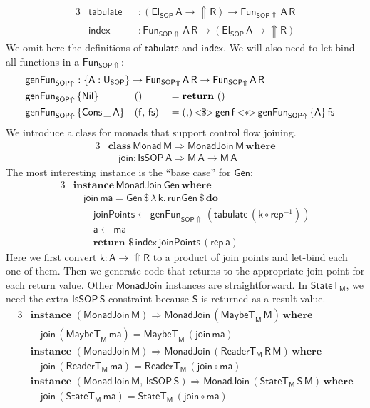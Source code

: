 \documentclass[acmsmall,screen,review,anonymous]{acmart}
\newcommand{\mit}[1]{{\mathsf{#1}}}
\newcommand{\msf}[1]{{\mathsf{#1}}}
\newcommand{\mbf}[1]{{\mathbf{#1}}}
\newcommand{\mdo}{\mbf{do}\,}
\newcommand{\ind}{\hspace{1em}}
\newcommand{\return}{\mbf{return}\,}
\newcommand{\lam}{\lambda\,}
\newcommand{\where}{\mbf{where}}
\newcommand{\M}{\msf{M}}
\newcommand{\vma}{\mathsf{ma}}
\newcommand{\vk}{\mathsf{k}}
\newcommand{\vA}{\mathsf{A}}
\newcommand{\vS}{\mathsf{S}}
\newcommand{\vR}{\mathsf{R}}
\newcommand{\vM}{\mathsf{M}}
\newcommand{\va}{\mathsf{a}}
\newcommand{\vf}{\mathsf{f}}
\newcommand{\vfs}{\mathsf{fs}}
\newcommand{\SOP}{\msf{SOP}}
\newcommand{\El}{\msf{El}}
\newcommand{\USOP}{\msf{U}_{\msf{SOP}}}
\newcommand{\IsSOP}{\msf{IsSOP}}
\newcommand{\Nil}{\msf{Nil}}
\newcommand{\Cons}{\msf{Cons}}
\newcommand{\ReaderT}{\msf{ReaderT}}
\newcommand{\Monad}{\msf{Monad}}
\newcommand{\fro}{\leftarrow}
\newcommand{\Lift}{{\Uparrow}}
\newcommand{\MaybeT}{\msf{MaybeT}}
\theoremstyle{remark}
\newcommand{\tyclass}{\mbf{class}}
\newcommand{\instance}{\mbf{instance}\,}
\newcommand{\Gen}{\msf{Gen}}
\newcommand{\gen}{\mit{gen}}
\newcommand{\fmap}{<\!\!\$\!\!>}
\newcommand{\ap}{{<\!\!*\!\!>}}
\newcommand{\runGen}{\mit{runGen}}
\newcommand{\RA}{\Rightarrow}
\newcommand{\StateT}{\msf{StateT}}
\newcommand{\dlr}{\,\$\,}
\newcommand{\MonadJoin}{\msf{MonadJoin}}
\newcommand{\join}{\mit{join}}
\newcommand{\mindex}{\mit{index}}
\newcommand{\mtabulate}{\mit{tabulate}}
\begin{document}
\begin{alignat*}{3}
  &\mtabulate &&: (\El_\SOP\,\vA \to \Lift \vR) \to \mit{Fun}_{\SOP\Lift}\,\vA\,\vR\\
  &\mindex    &&: \mit{Fun}_{\SOP\Lift}\,\vA\,\vR \to (\El_\SOP\,\vA \to \Lift \vR)
\end{alignat*}
We omit here the definitions of $\mtabulate$ and $\mindex$. We will also need to
let-bind all functions in a $\mit{Fun}_{\SOP\Lift}$:
\begin{alignat*}{3}
  & \mathrlap{\mit{genFun}_{\SOP\Lift} : \{\vA : \USOP\} \to \mit{Fun}_{\SOP\Lift}\,\vA\,\vR \to \mit{Fun}_{\SOP\Lift}\,\vA\,\vR}\\
  & \mit{genFun}_{\SOP\Lift}\,\{\Nil\}        && ()             &&= \return\,()\\
  & \mit{genFun}_{\SOP\Lift}\,\{\Cons\,\_\,\vA\}&& (\vf,\,\mit{\vfs}) &&= ({,})\,{\fmap}\,\gen\,\vf\,{\ap}\,\mit{genFun}_{\SOP\Lift}\,\{\vA\}\,\vfs
\end{alignat*}
We introduce a class for monads that support control flow joining.
\begin{alignat*}{3}
  & \tyclass\,\Monad\,\vM \RA \MonadJoin\,\vM\,\where\\
  & \ind \join : \IsSOP\,\vA \RA \vM\,\vA \to \vM\,\vA
\end{alignat*}
The most interesting instance is the ``base case'' for $\Gen$:
\begin{alignat*}{3}
  &\instance \MonadJoin\,\Gen\,\where\\
  &\ind \join\,\vma = \Gen \dlr \lam \vk.\,\runGen \dlr \mdo\\
  &\ind \ind \mit{joinPoints} \fro \mit{genFun}_{\SOP\Lift}\,(\mtabulate\,(\vk \circ \mit{rep}^{-1}))\\
  &\ind \ind \va \fro \vma\\
  &\ind \ind \return \dlr \mindex\,\mit{joinPoints}\,(\mit{rep}\,\va)
\end{alignat*}
Here we first convert $\vk : \vA \to \Lift \vR$ to a product of join points and
let-bind each one of them. Then we generate code that returns to the appropriate
join point for each return value. Other $\MonadJoin$ instances are straightforward. In
$\StateT_\M$, we need the extra $\IsSOP\,\vS$ constraint because $\vS$ is returned
as a result value.
\begin{alignat*}{3}
  & \instance\,(\MonadJoin\,\vM) \RA \MonadJoin\,(\MaybeT_\M\,\vM)\,\where\\
  & \ind \join\,(\MaybeT_\M\,\vma) = \MaybeT_\M\,(\join\,\vma)\\
  & \instance\,(\MonadJoin\,\vM) \RA \MonadJoin\,(\ReaderT_\M\,\vR\,\vM)\,\where\\
  & \ind \join\,(\ReaderT_\M\,\vma) = \ReaderT_\M\,(\join \circ \vma)\\
  & \instance\,(\MonadJoin\,\vM,\,\IsSOP\,\vS) \RA \MonadJoin\,(\StateT_\M\,\vS\,\vM)\,\where\\
  & \ind \join\,(\StateT_\M\,\vma) = \StateT_\M\,(\join \circ \vma)
\end{alignat*}
\end{document}
